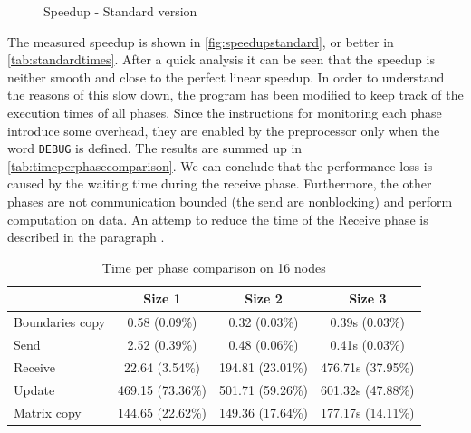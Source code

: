 \documentclass{article}
\begin{document}
\begin{figure}
\centering
{}
\caption{Speedup - Standard version}
\label{fig:speedupstandard}
\end{figure}
The measured speedup is shown in \autoref{fig:speedupstandard}, or better in \autoref{tab:standardtimes}. After a quick analysis it can be seen that the speedup is neither smooth and close to the perfect linear speedup. In order to understand the reasons of this slow down, the program has been modified to keep track of the execution times of all phases. Since the instructions for monitoring each phase introduce some overhead, they are enabled by the preprocessor only when the word \texttt{DEBUG} is defined. The results are summed up in \autoref{tab:timeperphasecomparison}. We can conclude that the performance loss is caused by the waiting time during the receive phase. Furthermore, the other phases are not communication bounded (the send are nonblocking) and perform computation on data. An attemp to reduce the time of the Receive phase is described in the paragraph .


\begin{table}
\centering
\begin{tabular}{|l|c|c|c|}
\hline
& Size 1 & Size 2 & Size 3 \\
\hline
Boundaries copy & 0.58 (0.09\%) & 0.32 (0.03\%) & 0.39s (0.03\%) \\
\hline
Send & 2.52 (0.39\%) & 0.48 (0.06\%) & 0.41s (0.03\%) \\
\hline
Receive & 22.64 (3.54\%) & 194.81 (23.01\%) & 476.71s (37.95\%) \\
\hline
Update & 469.15 (73.36\%) & 501.71 (59.26\%) & 601.32s (47.88\%) \\
\hline
Matrix copy & 144.65 (22.62\%) & 149.36 (17.64\%) & 177.17s (14.11\%) \\
\hline
\end{tabular}
\caption{Time per phase comparison on 16 nodes} \label{tab:timeperphasecomparison}
\end{table}
\end{document}
